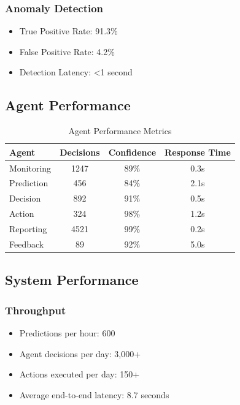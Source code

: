 \documentclass[conference]{IEEEtran}
\begin{document}
\subsubsection{Anomaly Detection}
\begin{itemize}
\item True Positive Rate: 91.3\%
\item False Positive Rate: 4.2\%
\item Detection Latency: <1 second
\end{itemize}

\subsection{Agent Performance}

\begin{table}[htbp]
\caption{Agent Performance Metrics}
\begin{center}
\begin{tabular}{|l|c|c|c|}
\hline
\textbf{Agent} & \textbf{Decisions} & \textbf{Confidence} & \textbf{Response Time} \\
\hline
Monitoring & 1247 & 89\% & 0.3s \\
Prediction & 456 & 84\% & 2.1s \\
Decision & 892 & 91\% & 0.5s \\
Action & 324 & 98\% & 1.2s \\
Reporting & 4521 & 99\% & 0.2s \\
Feedback & 89 & 92\% & 5.0s \\
\hline
\end{tabular}
\label{tab:agent_performance}
\end{center}
\end{table}

\subsection{System Performance}

\subsubsection{Throughput}
\begin{itemize}
\item Predictions per hour: 600
\item Agent decisions per day: 3,000+
\item Actions executed per day: 150+
\item Average end-to-end latency: 8.7 seconds
\end{itemize}
\end{document}
